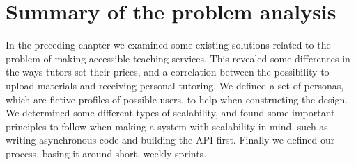 \section{Summary of the problem analysis}
In the preceding chapter we examined some existing solutions related to the problem of making accessible teaching services.
This revealed some differences in the ways tutors set their prices, and a correlation between the possibility to upload materials and receiving personal tutoring.
We defined a set of personas, which are fictive profiles of possible users, to help when constructing the design.
We determined some different types of scalability, and found some important principles to follow when making a system with scalability in mind, such as writing asynchronous code and building the API first.
Finally we defined our process, basing it around short, weekly sprints.
